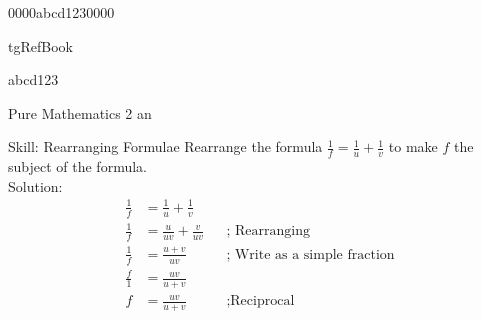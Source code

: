 0000abcd1230000\\



\begin{taggedblock}{tgRefBook}
\end{taggedblock}


abcd123\\

\begin{envRefBook}
    Pure Mathematics 2 an
\end{envRefBook}


\begin{bxTip}[colbacktitle=bkcolor]{Skill: Rearranging Formulae}
    Rearrange the formula $\frac{1}{f}=\frac{1}{u}+\frac{1}{v} $ to make $f$ the subject of the formula. \\
    
	\tcbline
    Solution:    
    \begin{align*}
        \frac{1}{f}&=\frac{1}{u}+\frac{1}{v}         && \text{ }                              \\[10pt]
        \frac{1}{f}&=\frac{u}{uv}+\frac{v}{uv}       && \text{; Rearranging}                   \\[10pt]
        \frac{1}{f}&=\frac{u+v}{uv}                  && \text{; Write as a simple fraction}    \\[10pt]
        \frac{f}{1}&=\frac{uv}{u+v}                  && \text{ }                            \\[10pt]
        f&=\frac{uv}{u+v}                            && \text{;Reciprocal}  
\end{align*}        
\end{bxTip}



